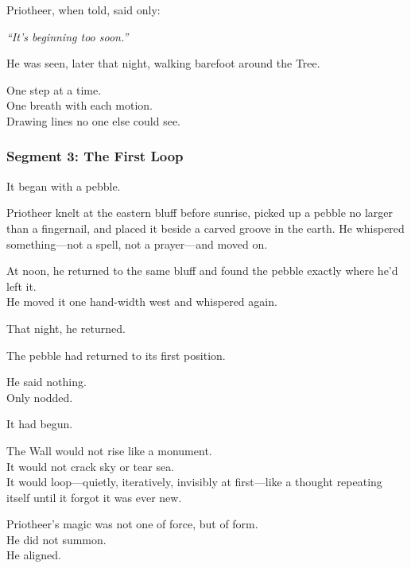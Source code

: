 \documentclass[9pt]{article}
\begin{document}
\vspace{0.5em}
Priotheer, when told, said only:

\vspace{0.5em}
\textit{``It’s beginning too soon.''}

\vspace{0.5em}
He was seen, later that night, walking barefoot around the Tree.

\vspace{0.5em}
One step at a time.\\
One breath with each motion.\\
Drawing lines no one else could see.

\newpage

\subsubsection*{Segment 3: The First Loop}

It began with a pebble.

\vspace{0.5em}
Priotheer knelt at the eastern bluff before sunrise, picked up a pebble no larger than a fingernail, and placed it beside a carved groove in the earth. He whispered something---not a spell, not a prayer---and moved on.

\vspace{0.5em}
At noon, he returned to the same bluff and found the pebble exactly where he’d left it.\\
He moved it one hand-width west and whispered again.

\vspace{0.5em}
That night, he returned.

\vspace{0.5em}
The pebble had returned to its first position.

\vspace{0.5em}
He said nothing.\\
Only nodded.

\vspace{0.5em}
It had begun.

\vspace{0.5em}
The Wall would not rise like a monument.\\
It would not crack sky or tear sea.\\
It would loop---quietly, iteratively, invisibly at first---like a thought repeating itself until it forgot it was ever new.

\vspace{0.5em}
Priotheer’s magic was not one of force, but of form.\\
He did not summon.\\
He aligned.
\end{document}
